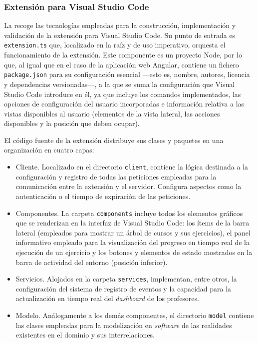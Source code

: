 \subsubsection{Extensión para Visual Studio Code}
\label{subsec:diseñoExtension}
La  recoge las tecnologías empleadas para la construcción, implementación y validación de la extensión para Visual Studio Code. Su punto de entrada es \texttt{extension.ts} que, localizado en la raíz y de uso imperativo, orquesta el funcionamiento de la extensión. Este componente es un proyecto Node, por lo que, al igual que en el caso de la aplicación web Angular, contiene un fichero \texttt{package.json} para su configuración esencial ---esto es, nombre, autores, licencia y dependencias versionadas---, a la que se suma la configuración que Visual Studio Code introduce en él, ya que incluye los comandos implementados, las opciones de configuración del usuario incorporadas e información relativa a las vistas disponibles al usuario (elementos de la vista lateral, las acciones disponibles y la posición que deben ocupar).

El código fuente de la extensión distribuye sus clases y paquetes en una organización en cuatro capas:
\begin{itemize}
    \item Cliente. Localizado en el directorio \texttt{client}, contiene la lógica destinada a la configuración y registro de todas las peticiones empleadas para la comunicación entre la extensión y el servidor. Configura aspectos como la autenticación o el tiempo de expiración de las peticiones.
    \item Componentes. La carpeta \texttt{components} incluye todos los elementos gráficos que se renderizan en la interfaz de Visual Studio Code: los ítems de la barra lateral (empleados para mostrar un árbol de cursos y sus ejercicios), el panel informativo empleado para la visualización del progreso en tiempo real de la ejecución de un ejercicio y los botones y elementos de estado mostrados en la barra de actividad del entorno (posición inferior).
    \item Servicios. Alojados en la carpeta \texttt{services}, implementan, entre otros, la configuración del sistema de registro de eventos y la capacidad para la actualización en tiempo real del \textit{dashboard} de los profesores.
    \item Modelo. Análogamente a los demás componentes, el directorio \texttt{model} contiene las clases empleadas para la modelización en \textit{software} de las realidades existentes en el dominio y sus interrelaciones.
\end{itemize}
